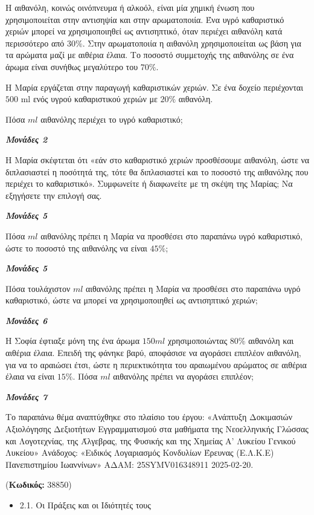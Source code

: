\documentclass[11pt,a4paper,twoside]{book}
\newcounter{askhsh}[chapter]
\renewcommand{\theaskhsh}{
	\bf{\titlefont{\Large{\thechapter}}.\arabic{askhsh}}
}
\newcommand{\Askhsh}[2]{\refstepcounter{askhsh}{\titlefont{Άσκηση\theaskhsh} - \textcolor{maincolor}{ΘΕΜΑ #2}} ({\small{\textbf{Κωδικός:} #1}})\\}{}
\newenvironment{ylh}{
\begin{tcolorbox}[
breakable,
enhanced standard,
titlerule=0pt,
toprule=0pt, 
rightrule=0pt, 
bottomrule=0pt,
title={\titlefont Ύλη άσκησης},
colback=white,
opacityback=0,
left=2mm,
top=1mm,
bottom=0mm,
boxrule=0pt,
colframe=white,
borderline west={1.5mm}{0pt}{secondarycolor},
leftrule=2mm,
sharp corners,
coltitle=black
]
\begin{itemize}[leftmargin=3mm, itemsep=0mm, label=\textcolor{secondarycolor}{{\small\faBook}}]
}{
\end{itemize}
\end{tcolorbox}
}
\newcommand{\monades}[1]{
\hspace*{\fill}
\textbf{\textit{\textcolor{maincolor}{Μονάδες #1}}}}
\begin{document}
Η αιθανόλη, κοινώς οινόπνευμα ή αλκοόλ, είναι μία χημική ένωση που χρησιμοποιείται στην αντισηψία και στην αρωματοποιία. Ένα υγρό καθαριστικό χεριών μπορεί να χρησιμοποιηθεί ως αντισηπτικό, όταν περιέχει αιθανόλη κατά περισσότερο από $30\%$. Στην αρωματοποιία η αιθανόλη χρησιμοποιείται ως βάση για τα αρώματα μαζί με αιθέρια έλαια. Το ποσοστό συμμετοχής της αιθανόλης σε ένα άρωμα είναι συνήθως μεγαλύτερο του $70\%$.

\begin{alist}
\item Η Μαρία εργάζεται στην παραγωγή καθαριστικών χεριών. Σε ένα δοχείο περιέχονται $500$ ml ενός υγρού καθαριστικού χεριών με $20\%$ αιθανόλη.

\begin{rlist}
\item Πόσα $ml$ αιθανόλης περιέχει το υγρό καθαριστικό;
\monades{2}
\item Η Μαρία σκέφτεται ότι «εάν στο καθαριστικό χεριών προσθέσουμε αιθανόλη, ώστε να διπλασιαστεί η ποσότητά της, τότε θα διπλασιαστεί και το ποσοστό της αιθανόλης που περιέχει το καθαριστικό». Συμφωνείτε ή διαφωνείτε με τη σκέψη της Μαρίας; Να εξηγήσετε την επιλογή σας.
\monades{5}
\item Πόσα $ml$ αιθανόλης πρέπει η Μαρία να προσθέσει στο παραπάνω υγρό καθαριστικό, ώστε το ποσοστό της αιθανόλης να είναι $45\%$;
\monades{5}
\item Πόσα τουλάχιστον $ml$ αιθανόλης πρέπει η Μαρία να προσθέσει στο παραπάνω υγρό καθαριστικό, ώστε να μπορεί να χρησιμοποιηθεί ως αντισηπτικό χεριών;
\monades{6}
\end{rlist}
\item Η Σοφία έφτιαξε μόνη της ένα άρωμα $150ml$ χρησιμοποιώντας $80\%$ αιθανόλη και αιθέρια έλαια. Επειδή της φάνηκε βαρύ, αποφάσισε να αγοράσει επιπλέον αιθανόλη, για να το αραιώσει έτσι, ώστε η περιεκτικότητα του αραιωμένου αρώματος σε αιθέρια έλαια να είναι $15\%$. Πόσα $ml$ αιθανόλης πρέπει να αγοράσει επιπλέον;
\monades{7}

{\footnotesize Το παραπάνω θέμα αναπτύχθηκε στο πλαίσιο του έργου: «Ανάπτυξη Δοκιμασιών Αξιολόγησης Δεξιοτήτων Εγγραμματισμού στα μαθήματα της Νεοελληνικής Γλώσσας και Λογοτεχνίας, της Άλγεβρας, της Φυσικής και της Χημείας Α' Λυκείου Γενικού Λυκείου» Ανάδοχος: «Ειδικός Λογαριασμός Κονδυλίων Έρευνας (Ε.Λ.Κ.Ε) Πανεπιστημίου Ιωαννίνων» ΑΔΑΜ: 25SYMV016348911 2025-02-20.}
\end{alist}

\vspace{4mm}
\Askhsh{38850}{4}
\begin{ylh}
    \item 2.1. Οι Πράξεις και οι Ιδιότητές τους
\end{ylh}
\end{document}
